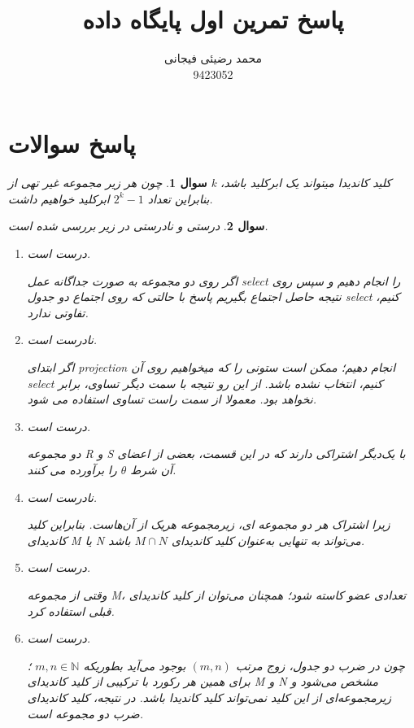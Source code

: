 \documentclass[12pt]{article}
\title{پاسخ تمرین اول پایگاه داده}
\author{محمد رضیئی فیجانی\\ 9423052}
\newtheorem{question}{سوال}
\begin{document}
\maketitle

\section{پاسخ سوالات}\label{chpt1}
\begin{question}
	چون هر زیر مجموعه غیر تهی از k کلید کاندیدا میتواند یک ابرکلید باشد، بنابراین تعداد 
	$2^k - 1$
	ابرکلید خواهیم داشت.
\end{question}
\begin{question}
درستی و نادرستی در زیر بررسی شده است.
\begin{enumerate}
	\item
	درست است.
	
	اگر روی دو مجموعه به صورت جداگانه عمل select را انجام دهیم و سپس روی نتیجه حاصل اجتماع بگیریم پاسخ با حالتی که روی اجتماع دو جدول select کنیم، تفاوتی ندارد.
	
	\item
	نادرست است.
	
	اگر ابتدای projection انجام دهیم؛ ممکن است ستونی را که میخواهیم روی آن select کنیم، انتخاب نشده باشد. از این رو نتیجه با سمت دیگر تساوی، برابر نخواهد بود. معمولا از سمت راست تساوی استفاده می شود.
	
	\item
	درست است.
	
	دو مجموعه R  و S با یک‌دیگر اشتراکی دارند که در این قسمت، بعضی از اعضای آن شرط $\theta$ را برآورده می کنند.
	
	\item
	نادرست است.
	
	زیرا اشتراک هر دو مجموعه ای، زیرمجموعه هریک از آن‌هاست. بنابراین کلید کاندیدای M یا N می‌تواند به تنهایی به‌عنوان کلید کاندیدای $M \cap N$ باشد.
	
	\item
درست است.

وقتی از مجموعه M، تعدادی عضو کاسته شود؛ همچنان می‌توان از کلید کاندیدای قبلی استفاده کرد.
	
	\item
درست است.

چون 	در ضرب دو جدول، زوج مرتب $(m,n)$ بوجود می‌آید بطوریکه
 $m,n \in \mathbb{N} $
 ؛ برای همین هر رکورد با ترکیبی از کلید کاندیدای M و  N مشخص می‌شود و زیرمجموعه‌ای از این کلید نمی‌تواند کلید کاندیدا باشد. در نتیجه، کلید کاندیدای ضرب دو مجموعه است.
	
	
	
	
\end{enumerate}
\end{question}
\end{document}
